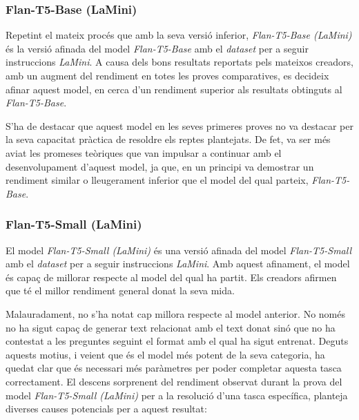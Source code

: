 \subsubsection{Flan-T5-Base (LaMini)}
Repetint el mateix procés que amb la seva versió inferior, \textit{Flan-T5-Base (LaMini)} \cite{flan-t5} \cite{lamini} és la versió afinada del model \textit{Flan-T5-Base} amb el \textit{dataset} per a seguir instruccions \textit{LaMini}. A causa dels bons resultats reportats pels mateixos creadors, amb un augment del rendiment en totes les proves comparatives, es decideix afinar aquest model, en cerca d'un rendiment superior als resultats obtinguts al \textit{Flan-T5-Base}. 

S'ha de destacar que aquest model en les seves primeres proves no va destacar per la seva capacitat pràctica de resoldre els reptes plantejats. De fet, va ser més aviat les promeses teòriques que van impulsar a continuar amb el desenvolupament d'aquest model, ja que, en un principi va demostrar un rendiment similar o lleugerament inferior que el model del qual parteix, \textit{Flan-T5-Base}.

\subsubsection{Flan-T5-Small (LaMini)}
El model \textit{Flan-T5-Small (LaMini)} \cite{flan-t5} \cite{lamini} és una versió afinada del model \textit{Flan-T5-Small} amb el \textit{dataset} per a seguir instruccions \textit{LaMini}. Amb aquest afinament, el model és capaç de millorar respecte al model del qual ha partit. Els creadors afirmen que té el millor rendiment general donat la seva mida.

Malauradament, no s'ha notat cap millora respecte al model anterior. No només no ha sigut capaç de generar text relacionat amb el text donat sinó que no ha contestat a les preguntes seguint el format amb el qual ha sigut entrenat. Deguts aquests motius, i veient que és el model més potent de la seva categoria, ha quedat clar que és necessari més paràmetres per poder completar aquesta tasca correctament. El descens sorprenent del rendiment observat durant la prova del model \textit{Flan-T5-Small (LaMini)} per a la resolució d'una tasca específica, planteja diverses causes potencials per a aquest resultat:

